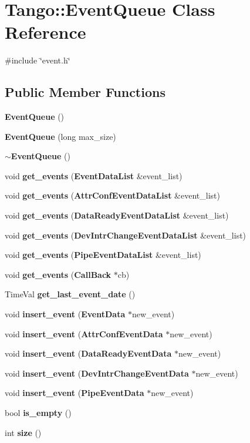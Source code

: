 \section{Tango\-:\-:Event\-Queue Class Reference}
\label{classTango_1_1EventQueue}


{\ttfamily \#include \char`\"{}event.\-h\char`\"{}}

\subsection*{Public Member Functions}
\begin{DoxyCompactItemize}
\item 
{\bf Event\-Queue} ()
\item 
{\bf Event\-Queue} (long max\-\_\-size)
\item 
{\bf $\sim$\-Event\-Queue} ()
\item 
void {\bf get\-\_\-events} ({\bf Event\-Data\-List} \&event\-\_\-list)
\item 
void {\bf get\-\_\-events} ({\bf Attr\-Conf\-Event\-Data\-List} \&event\-\_\-list)
\item 
void {\bf get\-\_\-events} ({\bf Data\-Ready\-Event\-Data\-List} \&event\-\_\-list)
\item 
void {\bf get\-\_\-events} ({\bf Dev\-Intr\-Change\-Event\-Data\-List} \&event\-\_\-list)
\item 
void {\bf get\-\_\-events} ({\bf Pipe\-Event\-Data\-List} \&event\-\_\-list)
\item 
void {\bf get\-\_\-events} ({\bf Call\-Back} $\ast$cb)
\item 
Time\-Val {\bf get\-\_\-last\-\_\-event\-\_\-date} ()
\item 
void {\bf insert\-\_\-event} ({\bf Event\-Data} $\ast$new\-\_\-event)
\item 
void {\bf insert\-\_\-event} ({\bf Attr\-Conf\-Event\-Data} $\ast$new\-\_\-event)
\item 
void {\bf insert\-\_\-event} ({\bf Data\-Ready\-Event\-Data} $\ast$new\-\_\-event)
\item 
void {\bf insert\-\_\-event} ({\bf Dev\-Intr\-Change\-Event\-Data} $\ast$new\-\_\-event)
\item 
void {\bf insert\-\_\-event} ({\bf Pipe\-Event\-Data} $\ast$new\-\_\-event)
\item 
bool {\bf is\-\_\-empty} ()
\item 
int {\bf size} ()
\end{DoxyCompactItemize}


